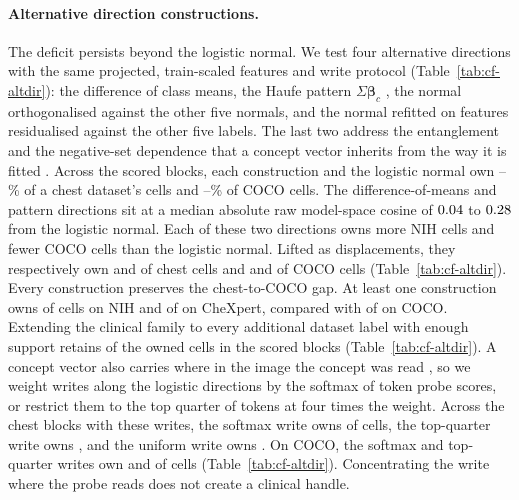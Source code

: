 \documentclass{article}
\begin{document}
\paragraph{Alternative direction constructions.} The deficit persists beyond the logistic normal. We test four alternative directions with the same projected, train-scaled features and write protocol (Table~\ref{tab:cf-altdir}): the difference of class means, the Haufe pattern $\Sigma\boldsymbol\beta_c$ \citep{haufe2014interpretation}, the normal orthogonalised against the other five normals, and the normal refitted on features residualised against the other five labels. The last two address the entanglement and the negative-set dependence that a concept vector inherits from the way it is fitted \citep{nicolson2025explaining}. Across the \cfAltdirBlocks{} scored blocks, each construction and the logistic normal own \cfAltdirChestPctMin{}--\cfAltdirChestPctMax\% of a chest dataset's cells and \cfAltdirCocoPctMin{}--\cfAltdirCocoPctMax\% of COCO cells. The difference-of-means and pattern directions sit at a median absolute raw model-space cosine of $0.04$ to $0.28$ from the logistic normal. Each of these two directions owns more NIH cells and fewer COCO cells than the logistic normal. Lifted as displacements, they respectively own \cfAltdirdChestDom{} and \cfAltdirdChestPattern{} of \cfAltdirdChestN{} chest cells and \cfAltdirdCocoDom{} and \cfAltdirdCocoPattern{} of \cfAltdirdCocoN{} COCO cells (Table~\ref{tab:cf-altdir}). Every construction preserves the chest-to-COCO gap. At least one construction owns \cfAltdirNihAny{} of \cfAltdirNihN{} cells on NIH and \cfAltdirChexAny{} of \cfAltdirChexN{} on CheXpert, compared with \cfAltdirCocoAny{} of \cfAltdirCocoN{} on COCO. Extending the clinical family to every additional dataset label with enough support retains \cfExtcompRetained{} of the \cfExtcompOwned{} owned cells in the \cfExtcompBlocks{} scored blocks (Table~\ref{tab:cf-altdir}). A concept vector also carries where in the image the concept was read \citep{nicolson2025explaining}, so we weight writes along the logistic directions by the softmax of token probe scores, or restrict them to the top quarter of tokens at four times the weight. Across the \cfTokenwChestBlocks{} chest blocks with these writes, the softmax write owns \cfTokenwSoftChestOwned{} of \cfTokenwChestCells{} cells, the top-quarter write owns \cfTokenwTopqChestOwned{}, and the uniform write owns \cfTokenwUniformChestOwned{}. On COCO, the softmax and top-quarter writes own \cfTokenwSoftCocoOwned{} and \cfTokenwTopqCocoOwned{} of \cfTokenwCocoCells{} cells (Table~\ref{tab:cf-altdir}). Concentrating the write where the probe reads does not create a clinical handle.
\end{document}
